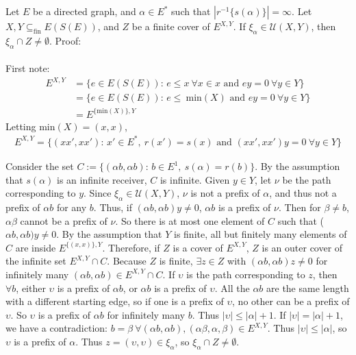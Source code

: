 \documentclass{article}
\begin{document}
Let $E$ be a directed graph, and $\alpha \in E^*$ such that $|r^{-1}\{s(\alpha)\}| = \infty$.
Let $X, Y \subseteq_{\text{fin}} E(S(E))$, and $Z$ be a finite cover of $E^{X, Y}$.
If $\xi_\alpha \in \mathcal{U}(X, Y)$, then $\xi_\alpha \cap Z \neq \emptyset$. Proof:
\\ \\
First note:
\begin{align*}
    E^{X, Y} &= \{ e \in E(S(E))\text{: } e \leq x \ \forall x \in x \text{ and } ey = 0 \ \forall y \in Y \} \\
             &= \{ e \in E(S(E))\text{: } e \leq \ \text{min}(X) \text{ and } ey = 0 \ \forall y \in Y \} \\
             &= E^{\{\text{min}(X)\}, Y}
\end{align*}
Letting min$(X) = (x, x)$,
\begin{align*}
    E^{X, Y} = \{ (xx', xx') \text{: } x' \in E^*, \ r(x') = s(x) \text{ and } (xx', xx')y = 0 \ \forall y \in Y \}
\end{align*}

Consider the set $C := \{ (\alpha b, \alpha b)\text{: } b \in E^1, \ s(\alpha) = r(b) \}$. By the assumption
that $s(\alpha)$ is an infinite receiver, $C$ is infinite. Given $y \in Y$, let $\nu$ be the path corresponding to $y$.
Since $\xi_\alpha \in \mathcal{U}(X, Y)$, $\nu$ is not a prefix of $\alpha$, and thus not a prefix of $\alpha b$ 
for any $b$. Thus, if $(\alpha b, \alpha b)y \neq 0$, $\alpha b$ is a prefix of $\nu$. Then for $\beta \neq b$, 
$\alpha \beta$ cannot be a prefix of $\nu$. So there is at most one element of $C$ such that ($\alpha b, \alpha b)y \neq 0$.
By the assumption that $Y$ is finite, all but finitely many elements of $C$ are inside $E^{\{(x, x)\}, Y}$. Therefore, if $Z$
is a cover of $E^{X, Y}$, $Z$ is an outer cover of the infinite set $E^{X, Y} \cap C$. Because $Z$ is finite, $\exists z \in Z$ 
with $(\alpha b, \alpha b)z \neq 0$ for infinitely many $(\alpha b, \alpha b) \in E^{X, Y} \cap C$. If $\upsilon$ is the path corresponding to $z$,
then $\forall b$, either $\upsilon$ is a prefix of $\alpha b$, or $\alpha b$ is a prefix of $\upsilon$.
All the $\alpha b$ are the same length with a different starting edge, so if one is a prefix of $\upsilon$,
no other can be a prefix of $\upsilon$. So $\upsilon$ is a prefix of $\alpha b$ for infinitely many $b$. Thus $|\upsilon| \leq |\alpha| + 1$.
If $|\upsilon| = |\alpha| + 1$, we have a contradiction: $b = \beta \ \forall (\alpha b, \alpha b), (\alpha \beta, \alpha, \beta) \in E^{X, Y}$.
Thus $|\upsilon| \leq |\alpha|$, so $\upsilon$ is a prefix of $\alpha$. Thus $z = (\upsilon, \upsilon) \in \xi_\alpha$, so $\xi_\alpha \cap Z \neq \emptyset$.
\end{document}
